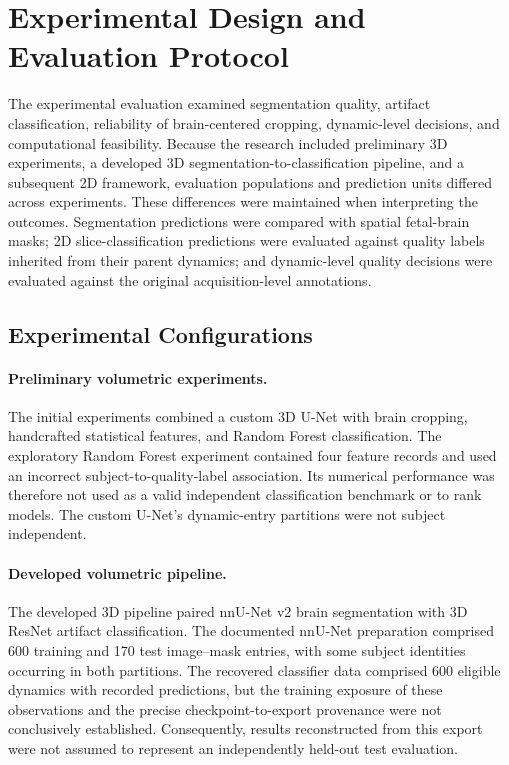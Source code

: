 \section{Experimental Design and Evaluation Protocol}
\label{sec:experimental-evaluation}

The experimental evaluation examined segmentation quality, artifact classification, reliability of brain-centered cropping, dynamic-level decisions, and computational feasibility. Because the research included preliminary 3D experiments, a developed 3D segmentation-to-classification pipeline, and a subsequent 2D framework, evaluation populations and prediction units differed across experiments. These differences were maintained when interpreting the outcomes. Segmentation predictions were compared with spatial fetal-brain masks; 2D slice-classification predictions were evaluated against quality labels inherited from their parent dynamics; and dynamic-level quality decisions were evaluated against the original acquisition-level annotations.

\subsection{Experimental Configurations}
\label{subsec:experimental-configurations}

\paragraph{Preliminary volumetric experiments.}
The initial experiments combined a custom 3D U-Net with brain cropping, handcrafted statistical features, and Random Forest classification. The exploratory Random Forest experiment contained four feature records and used an incorrect subject-to-quality-label association. Its numerical performance was therefore not used as a valid independent classification benchmark or to rank models. The custom U-Net's dynamic-entry partitions were not subject independent.

\paragraph{Developed volumetric pipeline.}
The developed 3D pipeline paired nnU-Net v2 brain segmentation with 3D ResNet artifact classification. The documented nnU-Net preparation comprised 600 training and 170 test image--mask entries, with some subject identities occurring in both partitions. The recovered classifier data comprised 600 eligible dynamics with recorded predictions, but the training exposure of these observations and the precise checkpoint-to-export provenance were not conclusively established. Consequently, results reconstructed from this export were not assumed to represent an independently held-out test evaluation.

